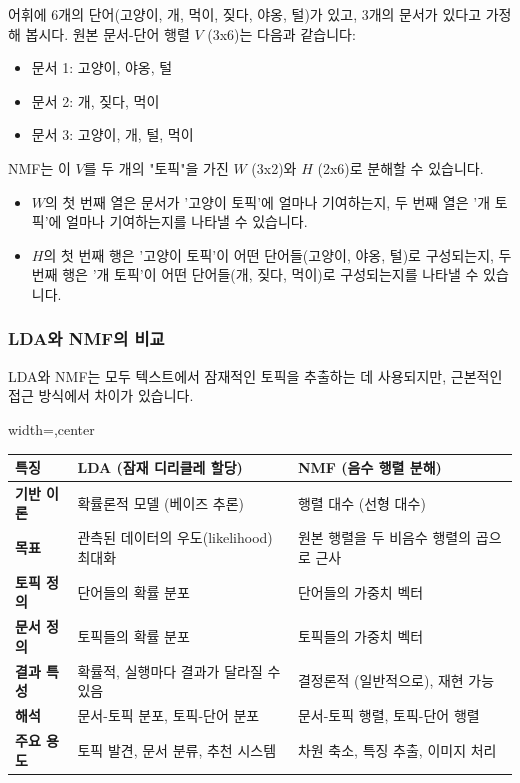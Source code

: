 \documentclass[11pt,a4paper]{article}
\theoremstyle{definition}
\begin{document}
\begin{tcolorbox}[example={NMF 행렬 분해 예시}]
어휘에 6개의 단어(고양이, 개, 먹이, 짖다, 야옹, 털)가 있고, 3개의 문서가 있다고 가정해 봅시다.
원본 문서-단어 행렬 $V$ (3x6)는 다음과 같습니다:
\begin{itemize}
    \item 문서 1: 고양이, 야옹, 털
    \item 문서 2: 개, 짖다, 먹이
    \item 문서 3: 고양이, 개, 털, 먹이
\end{itemize}
NMF는 이 $V$를 두 개의 "토픽"을 가진 $W$ (3x2)와 $H$ (2x6)로 분해할 수 있습니다.
\begin{itemize}
    \item $W$의 첫 번째 열은 문서가 '고양이 토픽'에 얼마나 기여하는지, 두 번째 열은 '개 토픽'에 얼마나 기여하는지를 나타낼 수 있습니다.
    \item $H$의 첫 번째 행은 '고양이 토픽'이 어떤 단어들(고양이, 야옹, 털)로 구성되는지, 두 번째 행은 '개 토픽'이 어떤 단어들(개, 짖다, 먹이)로 구성되는지를 나타낼 수 있습니다.
\end{itemize}
\end{tcolorbox}

\subsubsection{LDA와 NMF의 비교}
LDA와 NMF는 모두 텍스트에서 잠재적인 토픽을 추출하는 데 사용되지만, 근본적인 접근 방식에서 차이가 있습니다.

\begin{adjustbox}{width=\textwidth,center}
\begin{tabular}{lll}
\toprule
\textbf{특징} & \textbf{LDA (잠재 디리클레 할당)} & \textbf{NMF (음수 행렬 분해)} \\
\midrule
\textbf{기반 이론} & 확률론적 모델 (베이즈 추론) & 행렬 대수 (선형 대수) \\
\textbf{목표} & 관측된 데이터의 우도(likelihood) 최대화 & 원본 행렬을 두 비음수 행렬의 곱으로 근사 \\
\textbf{토픽 정의} & 단어들의 확률 분포 & 단어들의 가중치 벡터 \\
\textbf{문서 정의} & 토픽들의 확률 분포 & 토픽들의 가중치 벡터 \\
\textbf{결과 특성} & 확률적, 실행마다 결과가 달라질 수 있음 & 결정론적 (일반적으로), 재현 가능 \\
\textbf{해석} & 문서-토픽 분포, 토픽-단어 분포 & 문서-토픽 행렬, 토픽-단어 행렬 \\
\textbf{주요 용도} & 토픽 발견, 문서 분류, 추천 시스템 & 차원 축소, 특징 추출, 이미지 처리 \\
\bottomrule
\end{tabular}
\end{adjustbox}
\end{document}
